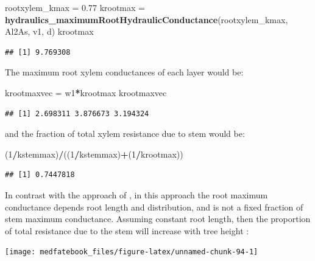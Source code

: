 \documentclass[]{book}
\newenvironment{Shaded}{\begin{snugshade}}{\end{snugshade}}
\newcommand{\KeywordTok}[1]{\textcolor[rgb]{0.13,0.29,0.53}{\textbf{#1}}}
\newcommand{\DecValTok}[1]{\textcolor[rgb]{0.00,0.00,0.81}{#1}}
\newcommand{\FloatTok}[1]{\textcolor[rgb]{0.00,0.00,0.81}{#1}}
\newcommand{\StringTok}[1]{\textcolor[rgb]{0.31,0.60,0.02}{#1}}
\newcommand{\OperatorTok}[1]{\textcolor[rgb]{0.81,0.36,0.00}{\textbf{#1}}}
\newcommand{\NormalTok}[1]{#1}
\begin{document}
\begin{Shaded}
\begin{Highlighting}[]
\NormalTok{rootxylem_kmax =}\StringTok{ }\FloatTok{0.77}
\NormalTok{krootmax =}\StringTok{ }\KeywordTok{hydraulics_maximumRootHydraulicConductance}\NormalTok{(rootxylem_kmax, Al2As, }
\NormalTok{                                                      v1, d)}
\NormalTok{krootmax}
\end{Highlighting}
\end{Shaded}

\begin{verbatim}
## [1] 9.769308
\end{verbatim}

The maximum root xylem conductances of each layer would be:

\begin{Shaded}
\begin{Highlighting}[]
\NormalTok{krootmaxvec =}\StringTok{ }\NormalTok{w1}\OperatorTok{*}\NormalTok{krootmax}
\NormalTok{krootmaxvec}
\end{Highlighting}
\end{Shaded}

\begin{verbatim}
## [1] 2.698311 3.876673 3.194324
\end{verbatim}

and the fraction of total xylem resistance due to stem would be:

\begin{Shaded}
\begin{Highlighting}[]
\NormalTok{(}\DecValTok{1}\OperatorTok{/}\NormalTok{kstemmax)}\OperatorTok{/}\NormalTok{((}\DecValTok{1}\OperatorTok{/}\NormalTok{kstemmax)}\OperatorTok{+}\NormalTok{(}\DecValTok{1}\OperatorTok{/}\NormalTok{krootmax))}
\end{Highlighting}
\end{Shaded}

\begin{verbatim}
## [1] 0.7447818
\end{verbatim}

In contrast with the approach of \citet{Christoffersen2016}, in this approach the root maximum conductance depends root length and distribution, and is not a fixed fraction of stem maximum conductance. Assuming constant root length, then the proportion of total resistance due to the stem will increase with tree height \citep{Magnani2000}:

\begin{center}\texttt{[image: medfatebook\_files/figure-latex/unnamed-chunk-94-1]} \end{center}
\end{document}
